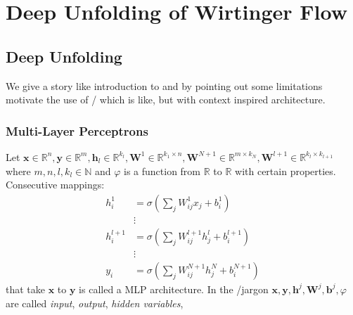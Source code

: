 \chapter{Deep Unfolding of Wirtinger Flow}\label{ch:deep_unfolding_of_wirtinger_flows}



\section{Deep Unfolding}

We give a story like introduction to \dl\cite{Goodfellow2016} and by pointing out some \dl limitations motivate the use of \du/\au\cite{Monga2019} 
which is \dl like, but with context inspired architecture.

\subsection{Multi-Layer Perceptrons}
Let $\boldsymbol{x} \in \mathbb{R}^n,\boldsymbol{y} \in \mathbb{R}^m, \boldsymbol{h}_l \in \mathbb{R}^{k_l}, \boldsymbol{W}^1 \in \mathbb{R}^{k_1 \times n}
,\boldsymbol{W}^{N+1} \in \mathbb{R}^{m \times k_N},\boldsymbol{W}^{l+1} \in \mathbb{R}^{k_l \times k_{l+1}}$ where $m,n,l,k_l \in \mathbb{N}$ and $\varphi$ is a
function from $\mathbb{R}$ to $\mathbb{R}$ with certain properties. 
Consecutive mappings:
\begin{equation}
  \begin{split}
    h_i^{1}   &= \sigma \left( \sum_{j}^{} W_{ij}^{1}x_j + b_i^{1} \right)\\ 
              & \vdots\\
    h_i^{l+1} &= \sigma \left( \sum_{j}^{} W_{ij}^{l+1}h_j^l + b_i^{l+1} \right)\\
              & \vdots\\
    y_i^{}    &= \sigma \left( \sum_{j}^{} W_{ij}^{N+1}h_j^N + b_i^{N+1} \right)
  \end{split}
  \end{equation}
that take $\boldsymbol{x}$ to $\boldsymbol{y}$ is called a \ac{MLP}\cite{Bishop2006} architecture.
In the \ml/\dl jargon \cite{Goodfellow2016}\cite{ShalevShwartz2014} $\boldsymbol{x},\boldsymbol{y},\boldsymbol{h}^j,\boldsymbol{W}^j,\boldsymbol{b}^j,\varphi$ are called \emph{input}, \emph{output}, \emph{hidden variables},
